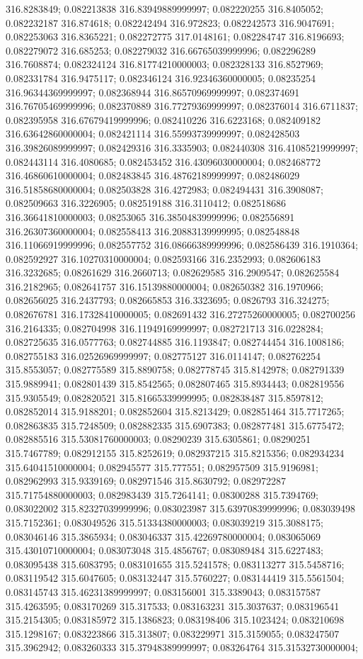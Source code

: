 316.8283849; 0.082213838 316.83949889999997; 0.082220255 316.8405052; 0.082232187 316.874618; 0.082242494 316.972823; 0.082242573 316.9047691; 0.082253063 316.8365221; 0.082272775 317.0148161; 0.082284747 316.8196693; 0.082279072 316.685253; 0.082279032 316.66765039999996; 0.082296289 316.7608874; 0.082324124 316.81774210000003; 0.082328133 316.8527969; 0.082331784 316.9475117; 0.082346124 316.92346360000005; 0.08235254 316.96344369999997; 0.082368944 316.86570969999997; 0.082374691 316.76705469999996; 0.082370889 316.77279369999997; 0.082376014 316.6711837; 0.082395958 316.67679419999996; 0.082410226 316.6223168; 0.082409182 316.63642860000004; 0.082421114 316.55993739999997; 0.082428503 316.39826089999997; 0.082429316 316.3335903; 0.082440308 316.41085219999997; 0.082443114 316.4080685; 0.082453452 316.43096030000004; 0.082468772 316.46860610000004; 0.082483845 316.48762189999997; 0.082486029 316.51858680000004; 0.082503828 316.4272983; 0.082494431 316.3908087; 0.082509663 316.3226905; 0.082519188 316.3110412; 0.082518686 316.36641810000003; 0.08253065 316.38504839999996; 0.082556891 316.26307360000004; 0.082558413 316.20883139999995; 0.082548848 316.11066919999996; 0.082557752 316.08666389999996; 0.082586439 316.1910364; 0.082592927 316.10270310000004; 0.082593166 316.2352993; 0.082606183 316.3232685; 0.08261629 316.2660713; 0.082629585 316.2909547; 0.082625584 316.2182965; 0.082641757 316.15139880000004; 0.082650382 316.1970966; 0.082656025 316.2437793; 0.082665853 316.3323695; 0.0826793 316.324275; 0.082676781 316.17328410000005; 0.082691432 316.27275260000005; 0.082700256 316.2164335; 0.082704998 316.11949169999997; 0.082721713 316.0228284; 0.082725635 316.0577763; 0.082744885 316.1193847; 0.082744454 316.1008186; 0.082755183 316.02526969999997; 0.082775127 316.0114147; 0.082762254 315.8553057; 0.082775589 315.8890758; 0.082778745 315.8142978; 0.082791339 315.9889941; 0.082801439 315.8542565; 0.082807465 315.8934443; 0.082819556 315.9305549; 0.082820521 315.81665339999995; 0.082838487 315.8597812; 0.082852014 315.9188201; 0.082852604 315.8213429; 0.082851464 315.7717265; 0.082863835 315.7248509; 0.082882335 315.6907383; 0.082877481 315.6775472; 0.082885516 315.53081760000003; 0.08290239 315.6305861; 0.08290251 315.7467789; 0.082912155 315.8252619; 0.082937215 315.8215356; 0.082934234 315.64041510000004; 0.082945577 315.777551; 0.082957509 315.9196981; 0.082962993 315.9339169; 0.082971546 315.8630792; 0.082972287 315.71754880000003; 0.082983439 315.7264141; 0.08300288 315.7394769; 0.083022002 315.82327039999996; 0.083023987 315.63970839999996; 0.083039498 315.7152361; 0.083049526 315.51334380000003; 0.083039219 315.3088175; 0.083046146 315.3865934; 0.083046337 315.42269780000004; 0.083065069 315.43010710000004; 0.083073048 315.4856767; 0.083089484 315.6227483; 0.083095438 315.6083795; 0.083101655 315.5241578; 0.083113277 315.5458716; 0.083119542 315.6047605; 0.083132447 315.5760227; 0.083144419 315.5561504; 0.083145743 315.46231389999997; 0.083156001 315.3389043; 0.083157587 315.4263595; 0.083170269 315.317533; 0.083163231 315.3037637; 0.083196541 315.2154305; 0.083185972 315.1386823; 0.083198406 315.1023424; 0.083210698 315.1298167; 0.083223866 315.313807; 0.083229971 315.3159055; 0.083247507 315.3962942; 0.083260333 315.37948389999997; 0.083264764 315.31532730000004; 